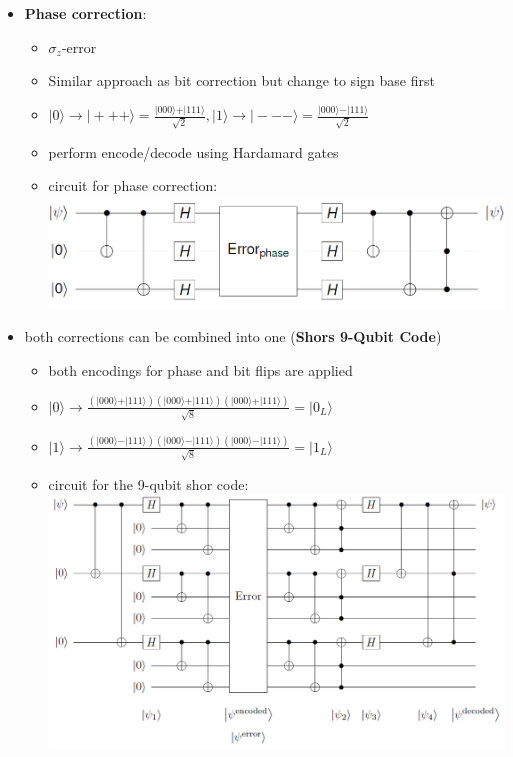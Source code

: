 \documentclass[12pt,a4paper]{article}
\newcommand{\ket}[1]{\vert #1 \rangle}
\begin{document}
\begin{itemize}
\begin{itemize}
\end{itemize}
\item \textbf{Phase correction}:
\begin{itemize}
\item $\sigma_z$-error
\item Similar approach as bit correction but change to sign base first
\item $\ket{0} \rightarrow \ket{+ + +}=\frac{\ket{000}+\ket{111}}{\sqrt{2}}, \ket{1}\rightarrow\ket{- - -}=\frac{\ket{000}-\ket{111}}{\sqrt{2}}$
\item perform encode/decode using Hardamard gates
\item circuit for phase correction:\\\includegraphics[scale=0.3]{./resources/phasecirc.png}
\end{itemize}
\item both corrections can be combined into one (\textbf{Shors 9-Qubit Code})
\begin{itemize}
\item both encodings for phase and bit flips are applied
\item $\ket{0} \rightarrow \frac{(\ket{000}+\ket{111})(\ket{000}+\ket{111})(\ket{000}+\ket{111})}{\sqrt{8}}=\ket{0_L}$
\item $\ket{1} \rightarrow \frac{(\ket{000}-\ket{111})(\ket{000}-\ket{111})(\ket{000}-\ket{111})}{\sqrt{8}}=\ket{1_L}$
\item circuit for the 9-qubit shor code:\\\includegraphics[scale=0.3]{./resources/shorcirc.png}
\end{itemize}
\end{itemize}
\end{document}
